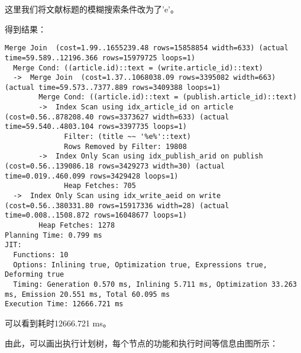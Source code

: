 \documentclass{article}
\begin{document}
这里我们将文献标题的模糊搜索条件改为了'e'。

得到结果：

\begin{lstlisting}
Merge Join  (cost=1.99..1655239.48 rows=15858854 width=633) (actual time=59.589..12196.366 rows=15979725 loops=1)
  Merge Cond: ((article.id)::text = (write.article_id)::text)
  ->  Merge Join  (cost=1.37..1068038.09 rows=3395082 width=663) (actual time=59.573..7377.889 rows=3409388 loops=1)
        Merge Cond: ((article.id)::text = (publish.article_id)::text)
        ->  Index Scan using idx_article_id on article  (cost=0.56..878208.40 rows=3373627 width=633) (actual time=59.540..4803.104 rows=3397735 loops=1)
              Filter: (title ~~ '%e%'::text)
              Rows Removed by Filter: 19808
        ->  Index Only Scan using idx_publish_arid on publish  (cost=0.56..139086.18 rows=3429273 width=30) (actual time=0.019..460.099 rows=3429428 loops=1)
              Heap Fetches: 705
  ->  Index Only Scan using idx_write_aeid on write  (cost=0.56..380331.80 rows=15917336 width=28) (actual time=0.008..1508.872 rows=16048677 loops=1)
        Heap Fetches: 1278
Planning Time: 0.799 ms
JIT:
  Functions: 10
  Options: Inlining true, Optimization true, Expressions true, Deforming true
  Timing: Generation 0.570 ms, Inlining 5.711 ms, Optimization 33.263 ms, Emission 20.551 ms, Total 60.095 ms
Execution Time: 12666.721 ms
\end{lstlisting}

可以看到耗时12666.721 ms。

由此，可以画出执行计划树，每个节点的功能和执行时间等信息由图所示：
\end{document}
